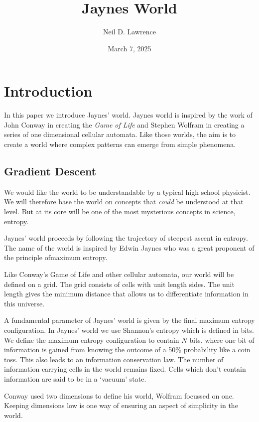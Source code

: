 \documentclass[11pt,a4paper]{article}
\title{\LARGE \textbf{Jaynes World}}
\author{Neil D. Lawrence}
\date{March 7, 2025}
\begin{document}
\maketitle

\begin{abstract}
\end{abstract}

\section{Introduction}

In this paper we introduce Jaynes' world. Jaynes world is inspired by the work of John Conway in creating the \emph{Game of Life} and Stephen Wolfram in creating a series of one dimensional cellular automata. Like those worlds, the aim is to create a world where complex patterns can emerge from simple phenomena. 

\subsection{Gradient Descent}

We would like the world to be understandable by a typical high school physicist. We will therefore base the world on concepts that \emph{could} be understood at that level. But at its core will be one of the most mysterious concepts in science, entropy. 

Jaynes' world proceeds by following the trajectory of steepest ascent in entropy. The name of the world is inspired by Edwin Jaynes who was a great proponent of the principle ofmaximum entropy.

Like Conway's Game of Life and other cellular automata, our world will be defined on a grid. The grid consists of cells with unit length sides. The unit length gives the minimum distance that allows us to differentiate information in this universe. 

A fundamental parameter of Jaynes' world is given by the final maximum entropy configuration. In Jaynes' world we use Shannon's entropy which is defined in bits. We define the maximum entropy configuration to contain $N$ bits, where one bit of information is gained from knowing the outcome of a 50\% probability like a coin toss. This also leads to an information conservation law. The number of information carrying cells in the world remains fixed. Cells which don't contain information are said to be in a `vacuum' state.  

Conway used two dimensions to define his world, Wolfram focussed on one. Keeping dimensions low is one way of ensuring an aspect of simplicity in the world.
\end{document}
